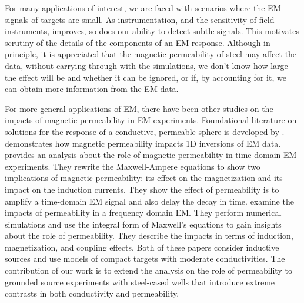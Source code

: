 \documentclass[onecolumn, extra, mreferee]{gji}
\begin{document}
For many applications of interest, we are faced with scenarios where the EM signals of targets are small. As instrumentation, and the sensitivity of field instruments, improves, so does our ability to detect subtle signals. This motivates scrutiny of the details of the components of an EM response. Although in principle, it is appreciated that the magnetic permeability of steel may affect the data, without carrying through with the simulations, we don't know how large the effect will be and whether it can be ignored, or if, by accounting for it, we can obtain more information from the EM data.

For more general applications of EM, there have been other studies on the impacts of magnetic permeability in EM experiments. Foundational literature on solutions for the response of a conductive, permeable sphere is developed by \cite{wait_conducting_1951, wait_conducting_1953, ward_unique_1959}. \cite{zhang_simultaneous_1999} demonstrates how magnetic permeability impacts 1D inversions of EM data. \cite{Pavlov2001} provides an analysis about the role of magnetic permeability in time-domain EM experiments. They rewrite the Maxwell-Ampere equations to show two implications of magnetic permeability: its effect on the  magnetization and its impact on the induction currents. They show the effect of permeability is to amplify a time-domain EM signal and also delay the decay in time. \cite{Noh2016} examine the impacts of permeability in a frequency domain EM. They perform numerical simulations and use the integral form of Maxwell's equations to gain insights about the role of permeability. They describe the impacts in terms of induction, magnetization, and coupling effects. Both of these papers consider inductive sources and use models of compact targets with moderate conductivities. The contribution of our work is to extend the analysis on the role of permeability to grounded source experiments with steel-cased wells that introduce extreme contrasts in both conductivity and permeability.
\end{document}
